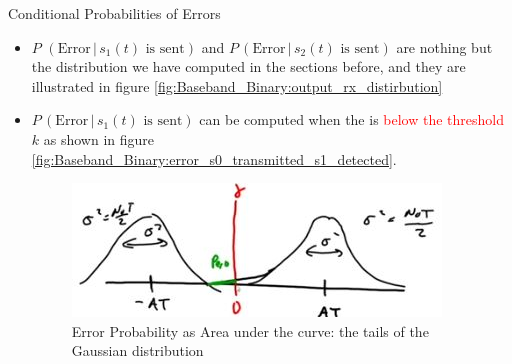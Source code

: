 \documentclass{Beamer}
\begin{document}
\begin{frame}[t]{Conditional Probabilities of Errors}

\begin{itemize}

\item $P \, \,(\text{Error} \, | \, s_1(t)\text{ is sent})$ and $ P \, (\text{Error} \, | \, s_2(t) \text{ is sent})$ are nothing but the distribution we have computed in the sections before, and they are illustrated in figure \autoref{fig:Baseband_Binary:output_rx_distirbution}

\item $ P \, (\text{Error} \, | \, s_1(t) \text{ is sent})$  can be computed when the  is \textcolor{red}{below the threshold} $k$ as shown in figure \autoref{fig:Baseband_Binary:error_s0_transmitted_s1_detected}.

\begin{figure}[h]
\centering
\includegraphics[scale=0.6]{Figures/Baseband_Binary/error_s0_transmitted_s1_detected}
\caption{Error Probability as Area under the curve: the tails of the Gaussian distribution}
\label{fig:Baseband_Binary:error_s0_transmitted_s1_detected}
\end{figure}

\end{itemize}

\end{frame}
\end{document}
